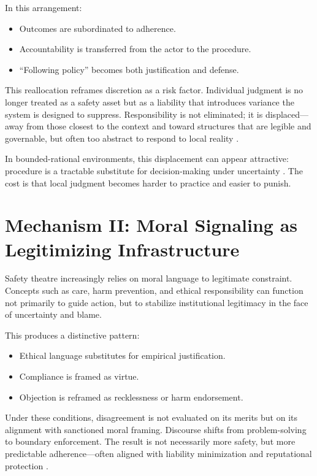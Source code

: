 \documentclass[11pt]{article}
\begin{document}
In this arrangement:

\begin{itemize}
  \item Outcomes are subordinated to adherence.
  \item Accountability is transferred from the actor to the procedure.
  \item ``Following policy'' becomes both justification and defense.
\end{itemize}

This reallocation reframes discretion as a risk factor. Individual judgment is no
longer treated as a safety asset but as a liability that introduces variance the system
is designed to suppress. Responsibility is not eliminated; it is displaced---away from
those closest to the context and toward structures that are legible and governable, but
often too abstract to respond to local reality \citep{Scott1998Seeing}.

In bounded-rational environments, this displacement can appear attractive: procedure is
a tractable substitute for decision-making under uncertainty \citep{Simon1955Behavioral}.
The cost is that local judgment becomes harder to practice and easier to punish.

\section{Mechanism II: Moral Signaling as Legitimizing Infrastructure}

Safety theatre increasingly relies on moral language to legitimate constraint. Concepts
such as care, harm prevention, and ethical responsibility can function not primarily to
guide action, but to stabilize institutional legitimacy in the face of uncertainty and
blame.

This produces a distinctive pattern:

\begin{itemize}
  \item Ethical language substitutes for empirical justification.
  \item Compliance is framed as virtue.
  \item Objection is reframed as recklessness or harm endorsement.
\end{itemize}

Under these conditions, disagreement is not evaluated on its merits but on its
alignment with sanctioned moral framing. Discourse shifts from problem-solving to
boundary enforcement. The result is not necessarily more safety, but more predictable
adherence---often aligned with liability minimization and reputational protection
\citep{Power2004Risk}.
\end{document}
